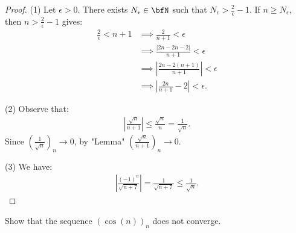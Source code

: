 \documentclass[10pt,twoside,openany]{memoir}
\begin{document}
        {\color{red} \begin{proof}
            (1) Let $\epsilon > 0$. There exists $N_\epsilon \in \bfN$ such that $N_\epsilon > \frac{2}{\epsilon} - 1$. If $n \geq N_\epsilon$, then $n > \frac{2}{\epsilon} - 1$ gives:
                \begin{equation*}
                \begin{split}
                    \frac{2}{\epsilon} < n+ 1 
                    &\implies \frac{2}{n+1} < \epsilon  \\
                    &\implies \frac{|2n -2n - 2|}{n+1} < \epsilon \\
                    &\implies \left|\frac{2n - 2(n+1)}{n+1}\right| < \epsilon\\
                    & \implies \left|\frac{2n}{n+1} - 2\right| < \epsilon.
                \end{split}
                \end{equation*}

            (2) Observe that:
                \begin{equation*}
                \begin{split}
                    \left|\frac{\sqrt{n}}{n+1}\right| \leq \frac{\sqrt{n}}{n} = \frac{1}{\sqrt{n}}.
                \end{split}
                \end{equation*}
            Since $\left(\frac{1}{\sqrt{n}}\right)_n \rightarrow 0$, by "Lemma" $\left(\frac{\sqrt{n}}{n+1}\right)_n \rightarrow 0$.

            (3) We have:
                \begin{equation*}
                \begin{split}
                    \left|\frac{(-1)^n}{\sqrt{n+7}}\right| = \frac{1}{\sqrt{n+7}} \leq \frac{1}{\sqrt{n}}.
                \end{split}
                \end{equation*}
        \end{proof}}
    \begin{exercise}
        Show that the sequence $(\cos(n))_n$ does not converge.
    \end{exercise}
\end{document}
